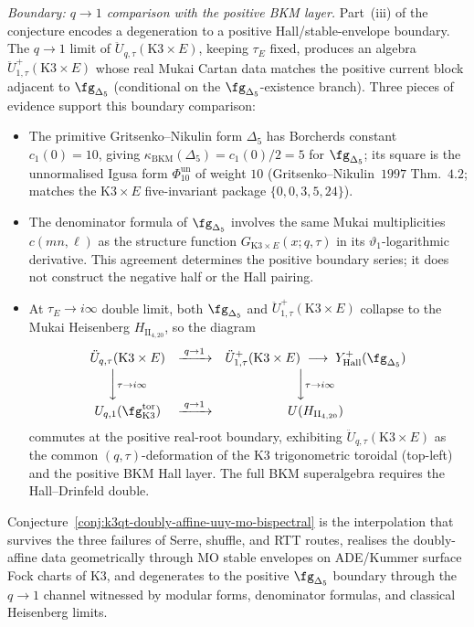 \begin{remark}
\emph{Boundary: $q \to 1$ comparison with the positive BKM layer.}
Part~(iii) of the conjecture encodes a degeneration to a positive
Hall/stable-envelope boundary. The $q\to1$ limit of
$\ddot U_{q,\tau}(\mathrm K3\times E)$, keeping $\tau_E$ fixed, produces
an algebra $\ddot U^+_{1,\tau}(\mathrm K3\times E)$ whose real Mukai
Cartan data matches the positive current block adjacent to
$\fg_{\Delta_5}$ (conditional on the $\fg_{\Delta_5}$-existence branch).
Three pieces of evidence support this boundary comparison:
\begin{itemize}
\item The primitive Gritsenko--Nikulin form $\Delta_5$ has Borcherds
constant $c_1(0)=10$, giving
$\kappa_{\mathrm{BKM}}(\Delta_5)=c_1(0)/2=5$ for
$\fg_{\Delta_5}$; its square is the unnormalised Igusa form
\(\Phi_{10}^{\mathrm{un}}\) of weight
$10$ (Gritsenko--Nikulin~$1997$ Thm.~$4.2$; matches the
$\mathrm K3 \times E$ five-invariant package $\{0, 0, 3, 5, 24\}$).
\item The denominator formula of $\fg_{\Delta_5}$ involves the same
Mukai multiplicities $c(mn,\ell)$ as the structure function
$G_{\mathrm K3\times E}(x;q,\tau)$ in its $\vartheta_1$-logarithmic
derivative. This agreement determines the positive boundary series; it
does not construct the negative half or the Hall pairing.
\item At $\tau_E \to i\infty$ double limit, both $\fg_{\Delta_5}$ and
$\ddot U^+_{1,\tau}(\mathrm K3 \times E)$ collapse to the Mukai
Heisenberg $H_{\mathrm{II}_{4, 20}}$, so the diagram
\[
\begin{array}{ccc}
\ddot U_{q, \tau}(\mathrm K3 \times E)
 & \xrightarrow{\;q \to 1\;}
 & \ddot U^+_{1,\tau}(\mathrm K3 \times E)
 \;\longrightarrow\; Y^+_{\mathrm{Hall}}(\fg_{\Delta_5}) \\[2pt]
\bigg\downarrow \scriptstyle{\tau \to i\infty}
 & & \bigg\downarrow \scriptstyle{\tau \to i\infty} \\[2pt]
U_{q, 1}(\fg_{\mathrm K3}^{\mathrm{tor}})
 & \xrightarrow{\;q \to 1\;}
 & U(H_{\mathrm{II}_{4, 20}})
\end{array}
\]
commutes at the positive real-root boundary, exhibiting
$\ddot U_{q, \tau}(\mathrm K3 \times E)$ as the common
$(q, \tau)$-deformation of the K3 trigonometric toroidal (top-left)
and the positive BKM Hall layer. The full BKM superalgebra requires the
Hall--Drinfeld double.
\end{itemize}

Conjecture~\ref{conj:k3qt-doubly-affine-uuy-mo-bispectral} is the
interpolation that survives the three failures of Serre, shuffle, and
RTT routes, realises the doubly-affine data geometrically through MO
stable envelopes on ADE/Kummer surface Fock charts of K3, and
degenerates to the positive $\fg_{\Delta_5}$ boundary through the
$q\to1$ channel witnessed by modular forms, denominator formulas, and
classical Heisenberg limits.
\end{remark}

